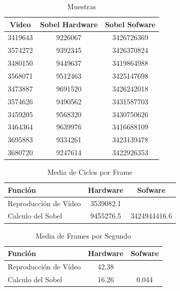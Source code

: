 \documentclass[a4paper,12pt,titlepage,final]{book}
\begin{document}
\begin{table}[hd]
\centering
\begin{tabular}{*{3}{c}}
Video   & Sobel Hardware & Sobel Sofware \\
\hline
3419643 &    9226067     &  3426726369   \\
3574272 &    9392345     &  3426370824   \\
3480150 &    9449637     &  3419864988   \\
3568071 &    9512463     &  3425147698   \\
3473887 &    9691520     &  3426242018   \\
3574626 &    9490562     &  3431587703   \\
3459205 &    9568320     &  3430750626   \\
3464364 &    9639976     &  3416688109   \\
3695883 &    9334261     &  3423139478   \\
3680720 &    9247614     &  3422926353   \\
\end{tabular}
\caption{Muestras}
\label{tab:Muestras}
\end{table}

\begin{table}[hd]
\centering
\begin{tabular}{l c c}
Función               & Hardware & Sofware \\
\hline
Reproducción de Vídeo & 3539082.1  &       \\
Calculo del Sobel     & 9455276.5  & 3424944416.6       \\
\end{tabular}
\caption{Media de Ciclos por Frame}
\label{tab:resutadosc}
\end{table}

\begin{table}[hd]
\centering
\begin{tabular}{l c c}
Función               & Hardware & Sofware \\
\hline
Reproducción de Vídeo & 42.38  &       \\
Calculo del Sobel     & 16.26  & 0.044       \\
\end{tabular}
\caption{Media de Frames por Segundo}
\label{tab:resutadosf}
\end{table}

\appendix
\pagestyle{empty}
\appendixpage
\noappendicestocpagenum
\addappheadtotoc
\end{document}
